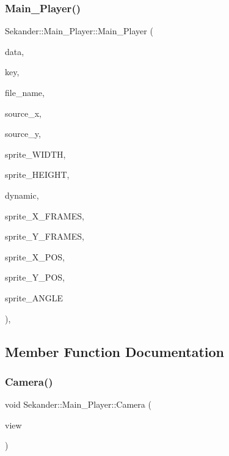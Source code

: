 \subsubsection{\texorpdfstring{Main\+\_\+\+Player()}{Main\_Player()}\hspace{0.1cm}{\footnotesize\ttfamily [2/2]}}
{\footnotesize\ttfamily Sekander\+::\+Main\+\_\+\+Player\+::\+Main\+\_\+\+Player (\begin{DoxyParamCaption}\item[{\hyperlink{namespaceSekander_a1d69b002ba2d23020901c28f0def5e16}{Game\+Data\+Ref}}]{data,  }\item[{std\+::string}]{key,  }\item[{std\+::string}]{file\+\_\+name,  }\item[{int}]{source\+\_\+x,  }\item[{int}]{source\+\_\+y,  }\item[{int}]{sprite\+\_\+\+W\+I\+D\+TH,  }\item[{int}]{sprite\+\_\+\+H\+E\+I\+G\+HT,  }\item[{bool}]{dynamic,  }\item[{int}]{sprite\+\_\+\+X\+\_\+\+F\+R\+A\+M\+ES,  }\item[{int}]{sprite\+\_\+\+Y\+\_\+\+F\+R\+A\+M\+ES,  }\item[{float}]{sprite\+\_\+\+X\+\_\+\+P\+OS,  }\item[{float}]{sprite\+\_\+\+Y\+\_\+\+P\+OS,  }\item[{float}]{sprite\+\_\+\+A\+N\+G\+LE }\end{DoxyParamCaption})\hspace{0.3cm}{\ttfamily [inline]}, {\ttfamily [explicit]}}



\subsection{Member Function Documentation}
\mbox{\label{classSekander_1_1Main__Player_ac11f979e3ea8f386e0997336670e740b}} 
\subsubsection{\texorpdfstring{Camera()}{Camera()}}
{\footnotesize\ttfamily void Sekander\+::\+Main\+\_\+\+Player\+::\+Camera (\begin{DoxyParamCaption}\item[{sf\+::\+View}]{view }\end{DoxyParamCaption})}

